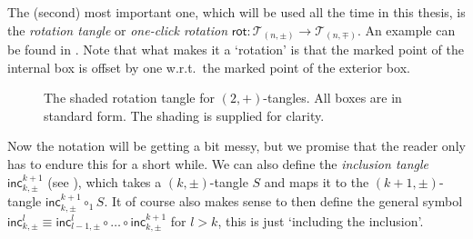 The (second) most important one, which will be used all the time in this thesis, is the \emph{rotation tangle} or \emph{one-click rotation} $\mathsf{rot}:\mathcal{T}_{(n,\pm)}\rightarrow \mathcal{T}_{(n,\mp)}$. An example can be found in . Note that what makes it a `rotation' is that the marked point of the internal box is offset by one w.r.t.\ the marked point of the exterior box.

\begin{figure}[!htp]\centering
	\caption[The rotation tangle]{The shaded rotation tangle for $(2,+)$-tangles. All boxes are in standard form. The shading is supplied for clarity.}
	\label{fig:rotation tangle}
\end{figure}

\bigno Now the notation will be getting a bit messy, but we promise that the reader only has to endure this for a short while. We can also define the \emph{inclusion tangle} $\textsf{inc}_{k,\pm}^{k+1}$ (see ), which takes a $(k,\pm)$-tangle $S$ and maps it to the $(k+1,\pm)$-tangle $\textsf{inc}_{k,\pm}^{k+1}\circ_1 S$. It of course also makes sense to then define the general symbol $\textsf{inc}_{k,\pm}^{l}\equiv \textsf{inc}_{l-1,\pm}^{l}\circ \ldots \circ \textsf{inc}_{k,\pm}^{k+1}$ for $l>k$, this is just `including the inclusion'.

